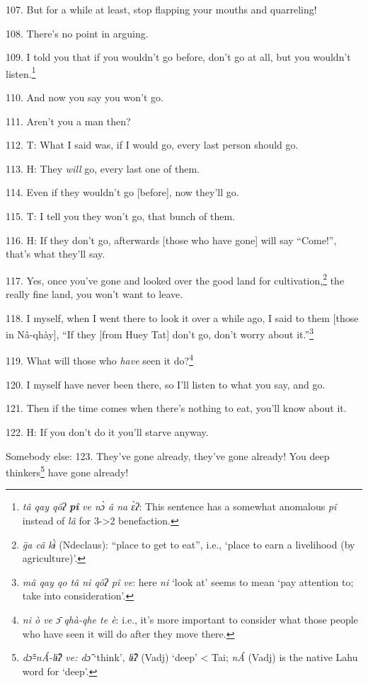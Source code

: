 107. But for a while at least, stop flapping your mouths and quarreling!

108. There's no point in arguing.

109. I told you that if you wouldn't go before, don't go at all, but you wouldn't
listen.\footnote{\textit{tâ qay qôʔ }\textit{\textbf{pî}}\textit{ ve nɔ̀ â na ɛ̀ʔ}:\textit{ }This sentence has a somewhat anomalous \textit{pî} instead of \textit{lâ} for 3->2 benefaction.}

110. And now you say you won't go.

111. Aren't you a man then?

112. T: What I said was, if I would go, every last person should go.

113. H: They \textit{will} go, every last one of them.

114. Even if they wouldn't go [before], now they'll go.

115. T: I tell you they won't go, that bunch of them.

116. H: If they don't go, afterwards [those who have gone] will say ``Come!'',
that's what they'll say.

117. Yes, once you've gone and looked over the good land for cultivation,\footnote{\textit{g̈a câ kɨ̀} (Ndeclaus): ``place to get to eat'', i.e., `place to earn a livelihood (by agriculture)'.} the
really fine land, you won't want to leave.

118. I myself, when I went there to look it over a while ago, I said to them [those
in Nâ-qhày], ``If they [from Huey Tat] don't go, don't worry about it.''\footnote{\textit{mâ qay qo tâ ni qôʔ pî ve}: here \textit{ni} `look at' seems to mean `pay attention to; take into consideration'.}

119. What will those who \textit{have} seen it do?\footnote{\textit{ni ò ve ɔ̄ qhà-qhe te è}: i.e., it's more important to consider what those people who have seen it will do after they move there.}

120. I myself have never been there, so I'll listen to what you say, and go.

121. Then if the time comes when there's nothing to eat, you'll know about it.

122. H: If you don't do it you'll starve anyway.

Somebody else: 123. They've gone already, they've gone already! You deep thinkers\footnote{\textit{dɔ̂꞊nÁ-lɨ̂ʔ ve: dɔ̂ }`think', \textit{lɨ̂ʔ} (Vadj) `deep' < Tai; \textit{nÁ} (Vadj) is the native Lahu word for `deep'.}
have gone already!

